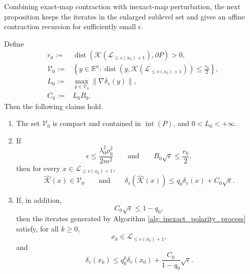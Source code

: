 \documentclass[smallextended]{svjour3}
\newcommand{\R}{\mathbb{R}}
\newcommand{\K}{\mathcal{K}}
\begin{document}
Combining exact-map contraction with inexact-map perturbation, the next
proposition keeps the iterates in the enlarged sublevel set and gives an affine
contraction recursion for sufficiently small $\epsilon$.
\begin{proposition}\label{prop: inexact_outer_control}
    Define
    \begin{align}
        r_0 := & \operatorname{dist}(\K(\mathcal{L}_{\leq v(x_0)+1}),\partial P)>0, \\
        \mathcal{V}_0 := & \left\{y\in \R^n:\operatorname{dist}(y,\K(\mathcal{L}_{\leq v(x_0)+1}))\le \frac{r_0}{2}\right\}, \\
        \label{eq: inexact_L0}
        L_0 := & \max_{y\in \mathcal{V}_0}\|\nabla \delta_v(y)\|,\\
        C_0 := & L_0B_0.
    \end{align}
    Then the following claims hold.
    \begin{enumerate}
        \item The set $\mathcal{V}_0$ is compact and contained in $\operatorname{int}(P)$, and $0< L_0<+\infty$. 
        \item If
        \[
            \epsilon\le \frac{\lambda_0^2\rho_0^2}{2m^2}
            \qquad \text{and} \qquad
            B_0\sqrt{\epsilon}\le \frac{r_0}{2},
        \]
        then for every $x\in \mathcal{L}_{\leq v(x_0)+1}$,
        \[
            \widehat{\K}(x)\in \mathcal{V}_0
            \qquad \text{and} \qquad
            \delta_v(\widehat{\K}(x))
            \le
            q_0\delta_v(x)+C_0\sqrt{\epsilon}.
        \]
        \item If, in addition,
        \[
            C_0\sqrt{\epsilon}\le 1-q_0,
        \]
        then the iterates generated by Algorithm \ref{alg: inexact_polarity_process}
        satisfy, for all $k\geq0$,
        \[
            x_k\in \mathcal{L}_{\leq v(x_0)+1},
        \]
        and
        \[
            \delta_v(x_k)
            \le
            q_0^k\delta_v(x_0)+\frac{C_0}{1-q_0}\sqrt{\epsilon}.
        \]
    \end{enumerate}
\end{proposition}
\end{document}
